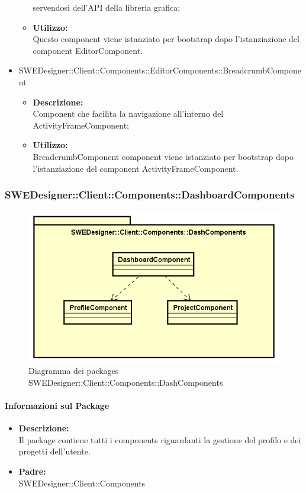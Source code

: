 \begin{itemize}
\begin{itemize}
				servendosi dell'API della libreria grafica;
				\item \textbf{Utilizzo: }\\
				Questo component viene istanziato per bootstrap dopo l'istanziazione
				del component EditorComponent.
			\end{itemize}
			\item SWEDesigner::Client::Components::EditorComponents::BreadcrumbComponent
			\begin{itemize}
				\item \textbf{Descrizione: }\\
				Component che facilita la navigazione all'interno del ActivityFrameComponent;
				\item \textbf{Utilizzo: }\\
				BreadcrumbComponent component viene istanziato per bootstrap dopo l'istanziazione
				del component ActivityFrameComponent.
			\end{itemize}
		\end{itemize}

		\subsubsection{SWEDesigner::Client::Components::DashboardComponents}
		 \begin{figure}[h!]
		\centering
		\includegraphics[scale=0.4]{Disegnetti/SWEDesigner__Client__Components__DashComponents.png}
		\caption{Diagramma dei packages SWEDesigner::Client::Components::DashComponents}
 		\end{figure}
		\paragraph{Informazioni sul Package}
		\begin{itemize}
			\item \textbf{Descrizione: }\\
			Il package contiene tutti i components riguardanti la gestione del profilo
			e dei progetti dell'utente.
			\item \textbf{Padre: }\\ SWEDesigner::Client::Components
		\end{itemize}

